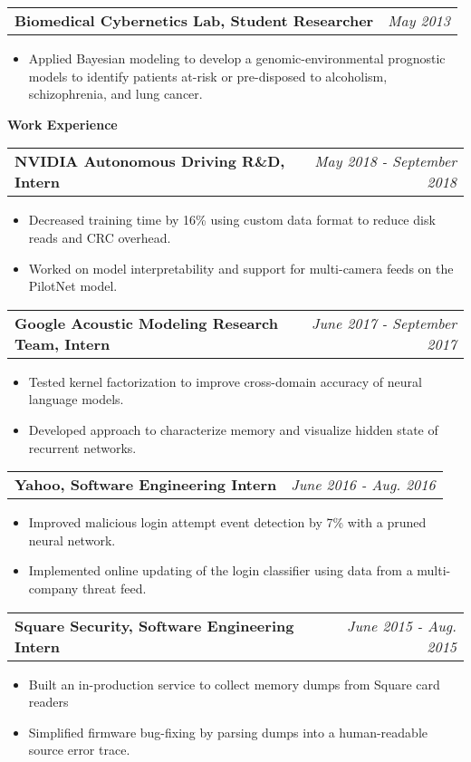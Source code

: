 \documentclass[letterpaper,11pt]{article}
\makeatletter
\newcommand{\resitem}[1]{\item[--] #1 \vspace{-4pt}}
\newcommand{\ressubheadingtwo}[2] {
\begin{tabular*}{7in}{l@{\extracolsep{\fill}}r}
	\textbf{#1} & \textit{#2} \\
\end{tabular*}\vspace{-6pt}}
\makeatother
\begin{document}
    \ressubheadingtwo{Biomedical Cybernetics Lab, Student Researcher}{May 2013}{}
	\begin{itemize}
            \itemsep0em
            \resitem{Applied Bayesian modeling to develop a genomic-environmental prognostic models to identify patients at-risk or pre-disposed to alcoholism, schizophrenia, and lung cancer.}
	\end{itemize}
    \vspace{0.05in}
\large \textbf{Work Experience\vspace{1mm}} \normalsize

	\ressubheadingtwo{NVIDIA Autonomous Driving R\&D, Intern}{May 2018 - September 2018}
	\begin{itemize}
            \itemsep0em
            \resitem{Decreased training time by 16\% using custom data format to reduce disk reads and CRC overhead.} 
            \resitem{Worked on model interpretability and support for multi-camera feeds on the PilotNet model.}
	\end{itemize}

	\ressubheadingtwo{Google Acoustic Modeling Research Team, Intern}{June 2017 - September 2017}
	\begin{itemize}
            \itemsep0em
            \resitem{Tested kernel factorization to improve cross-domain accuracy of neural language models.}
            \resitem{Developed approach to characterize memory and visualize hidden state of recurrent networks.}
	\end{itemize}

	\ressubheadingtwo{Yahoo, Software Engineering Intern}{June 2016 - Aug. 2016}
	\begin{itemize}
            \itemsep0em
            \resitem{Improved malicious login attempt event detection by 7\% with a pruned neural network.}
            \resitem{Implemented online updating of the login classifier using data from a multi-company threat feed.}
	\end{itemize}


	\ressubheadingtwo{Square Security, Software Engineering Intern}{June 2015 - Aug. 2015}
	\begin{itemize}
            \itemsep0em
            \resitem{Built an in-production service to collect memory dumps from Square card readers}
            \resitem{Simplified firmware bug-fixing by parsing dumps into a human-readable source error trace.}
	\end{itemize}
    \vspace{0.05in}
\end{document}
